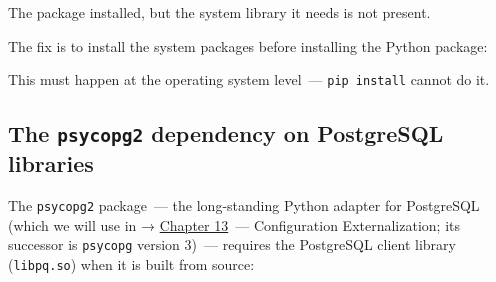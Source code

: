 \noindent{}The package installed, but the system library it needs is not present.

The fix is to install the system packages before installing the Python package:

\begin{codebox}[short]

\begin{Shaded}
\begin{Highlighting}[]
\end{Highlighting}
\end{Shaded}

\end{codebox}

\noindent{}This must happen at the operating system level~--- \texttt{pip\ install} cannot do it.

\subsection*{\texorpdfstring{The \texttt{psycopg2} dependency on PostgreSQL libraries}{The psycopg2 dependency on PostgreSQL libraries}}\label{07-environment-drift:the-psycopg2-dependency-on-postgresql-libraries}

The \texttt{psycopg2} package~--- the long-standing Python adapter for PostgreSQL (which we will use in → \hyperref[ch:13-configuration-externalization]{Chapter 13}~--- Configuration Externalization; its successor is \texttt{psycopg} version 3)~--- requires the PostgreSQL client library (\texttt{libpq.so}) when it is built from source:

\begin{codebox}[short]

\begin{Shaded}
\begin{Highlighting}[]

\end{Highlighting}
\end{Shaded}

\end{codebox}

